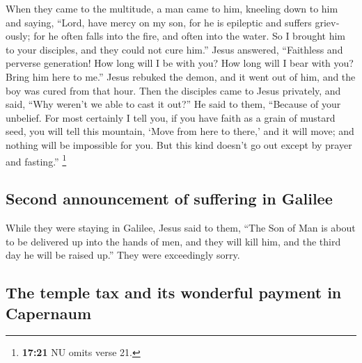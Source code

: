 \begin{paracol}{2}
\begin{otherlanguage}{english}
 When they came to the multitude, a man came to him,
kneeling down to him and saying,  ``Lord, have mercy on
my son, for he is epileptic and suffers grievously; for he often falls
into the fire, and often into the water.  So I brought
him to your disciples, and they could not cure him.'' 
Jesus answered, ``Faithless and perverse generation! How long will I be
with you? How long will I bear with you? Bring him here to me.''
 Jesus rebuked the demon, and it went out of him, and the
boy was cured from that hour.  Then the disciples came to
Jesus privately, and said, ``Why weren't we able to cast it out?''
 He said to them, ``Because of your unbelief. For most
certainly I tell you, if you have faith as a grain of mustard seed, you
will tell this mountain, `Move from here to there,' and it will move;
and nothing will be impossible for you.  But this kind
doesn't go out except by prayer and fasting.'' \footnote{\textbf{17:21}
  NU omits verse 21.}

\hypertarget{second-announcement-of-suffering-in-galilee}{%
\subsection{Second announcement of suffering in
Galilee}\label{second-announcement-of-suffering-in-galilee}}

 While they were staying in Galilee, Jesus said to them,
``The Son of Man is about to be delivered up into the hands of men,
 and they will kill him, and the third day he will be
raised up.'' They were exceedingly sorry.

\hypertarget{the-temple-tax-and-its-wonderful-payment-in-capernaum}{%
\subsection{The temple tax and its wonderful payment in
Capernaum}\label{the-temple-tax-and-its-wonderful-payment-in-capernaum}}


\end{otherlanguage}
\end{paracol}
